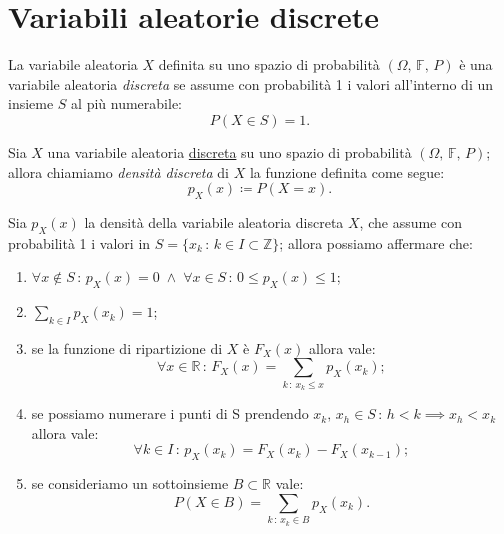     \section{Variabili aleatorie discrete}
    \begin{defn}\label{defn:Variabili_aleatorie_discrete}
            La variabile aleatoria $X$ definita su uno spazio di probabilità $(\Omega,\,\mathbb{F},\,P)$ è una variabile aleatoria \textit{discreta} se assume con probabilità 1 i valori all'interno di un insieme $S$ al più numerabile: \[
                P(X \in S) = 1
            .\] 
        \end{defn}
        \begin{defn}\label{defn:Densità_discreta}
            Sia $X$ una variabile aleatoria \underline{discreta} su uno spazio di probabilità $(\Omega,\,\mathbb{F},\,P)$; allora chiamiamo \textit{densità discreta} di $X$ la funzione definita come segue: \[
                p_X(x) \coloneqq P(X = x)
            .\]
        \end{defn}
        \begin{prty}\label{prty:Densità_discreta}
            Sia  $p_X(x)$ la densità della variabile aleatoria discreta $X$, che assume con probabilità 1 i valori in $S = \{x_k \,:\, k \in I \subset \mathbb{Z}\}$; allora possiamo affermare che:
            \begin{enumerate}
                \item $\forall x \notin S \,:\, p_X(x) = 0 \;\land\; \forall x \in S \,:\, 0 \leq p_X(x) \leq 1$;
                \item $\sum_{k \in I} p_X(x_k) = 1$;
                \item se la funzione di ripartizione di $X$ è $F_X(x)$ allora vale:  \[
                    \forall x \in \mathbb{R} \,:\, F_X(x) = \sum_{k\,:\,x_k \leq x} p_X(x_k)
                ;\]
                \item se possiamo numerare i punti di S prendendo $x_k,\,x_h \in S \,:\, h < k \implies x_h < x_k$ allora vale: \[
                    \forall k \in I \,:\, p_X(x_k) = F_X(x_k) - F_X(x_{k-1})
                ;\]
                \item se consideriamo un sottoinsieme $B \subset \mathbb{R}$ vale: \[
                    P(X \in B) = \sum_{k \,:\, x_k \in B} p_X(x_k)
                .\]
            \end{enumerate}
        \end{prty}
